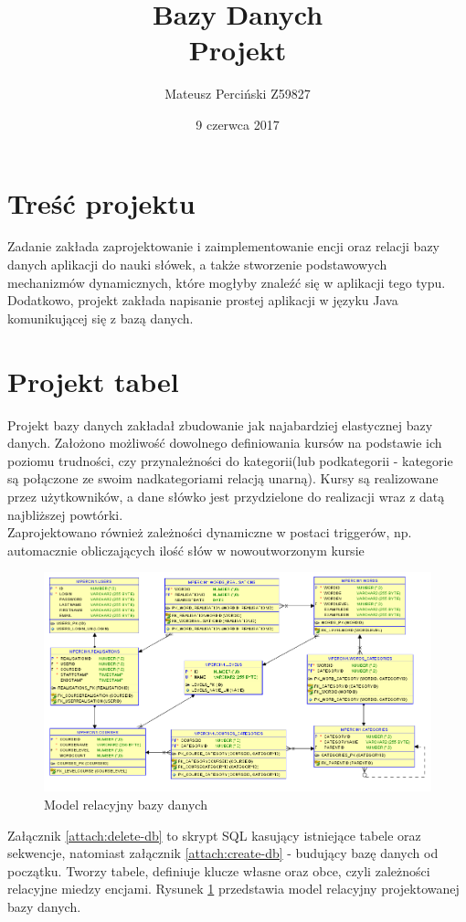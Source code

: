 \documentclass[11pt,a4paper]{article}
\title{Bazy Danych\\\large \medskip Projekt\\}
\author{Mateusz Perciński Z59827}
\date{9 czerwca 2017}
\begin{document}
\maketitle

\section*{Treść projektu}
Zadanie zakłada zaprojektowanie i zaimplementowanie encji oraz relacji bazy danych aplikacji do nauki słówek, a także stworzenie podstawowych mechanizmów dynamicznych, które mogłyby znaleźć się w aplikacji tego typu. Dodatkowo, projekt zakłada napisanie prostej aplikacji w języku Java komunikującej się z bazą danych. 

\section{Projekt tabel}
Projekt bazy danych zakładał zbudowanie jak najabardziej elastycznej bazy danych. Założono możliwość dowolnego definiowania kursów na podstawie ich poziomu trudności, czy przynależności do kategorii(lub podkategorii - kategorie są połączone ze swoim nadkategoriami relacją unarną). Kursy są realizowane przez użytkowników, a dane słówko jest przydzielone do realizacji wraz z datą najbliższej powtórki.\\
Zaprojektowano również zależności dynamiczne w postaci triggerów, np. automacznie obliczających ilość słów w nowoutworzonym kursie\\


\begin{figure}[ht!]
\includegraphics[width=\textwidth]{graphics/relational-model}
\caption{Model relacyjny bazy danych}
\label{fig:model}
\end{figure}

Załącznik \ref{attach:delete-db} to skrypt SQL kasujący istniejące tabele oraz sekwencje, natomiast załącznik \ref{attach:create-db} - budujący bazę danych od początku. Tworzy tabele, definiuje klucze własne oraz obce, czyli zależności relacyjne miedzy encjami. Rysunek \ref{fig:model} przedstawia model relacyjny projektowanej bazy danych.
\end{document}
